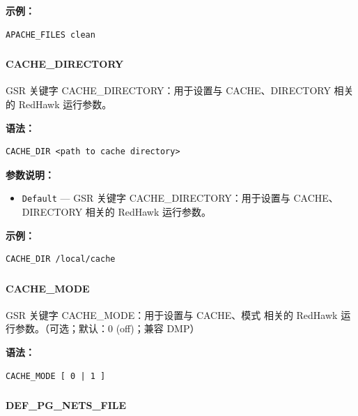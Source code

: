 \textbf{示例：}
\begin{lstlisting}
APACHE_FILES clean
\end{lstlisting}

\subsubsection{}
\paragraph*{CACHE_DIRECTORY}

GSR 关键字 CACHE_DIRECTORY：用于设置与 CACHE、DIRECTORY 相关的 RedHawk 运行参数。

\textbf{语法：}
\begin{lstlisting}
CACHE_DIR <path to cache directory>
\end{lstlisting}

\textbf{参数说明：}
\begin{itemize}
\item \texttt{Default} — GSR 关键字 CACHE\_DIRECTORY：用于设置与 CACHE、DIRECTORY 相关的 RedHawk 运行参数。
\end{itemize}

\textbf{示例：}
\begin{lstlisting}
CACHE_DIR /local/cache
\end{lstlisting}

\subsubsection{}
\paragraph*{CACHE_MODE}

GSR 关键字 CACHE_MODE：用于设置与 CACHE、模式 相关的 RedHawk 运行参数。（可选；默认：0 (off)；兼容 DMP）

\textbf{语法：}
\begin{lstlisting}
CACHE_MODE [ 0 | 1 ]
\end{lstlisting}

\subsubsection{}
\paragraph*{DEF_PG_NETS_FILE}

